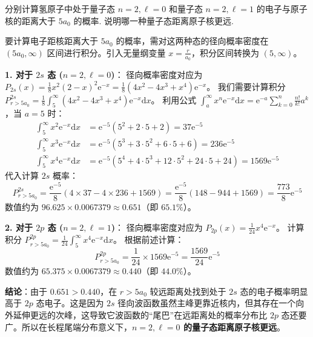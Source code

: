 \begin{exercise}\label{ex:25.8}
分别计算氢原子中处于量子态 $n=2, \ell=0$ 和量子态 $n=2, \ell=1$ 的电子与原子核的距离大于 $5a_0$ 的概率. 说明哪一种量子态距离原子核更远.
\end{exercise}
\begin{solution}
要计算电子距核距离大于 $5a_0$ 的概率，需对这两种态的径向概率密度在 $(5a_0, \infty)$ 区间进行积分。引入无量纲变量 $x = \frac{r}{a_0}$，积分区间转换为 $(5, \infty)$。

\textbf{1. 对于 $2s$ 态 ($n=2, \ell=0$)}：
径向概率密度对应为 $P_{2s}(x) = \frac{1}{8} x^2 (2 - x)^2 \mathrm{e}^{-x} = \frac{1}{8} (4x^2 - 4x^3 + x^4) \mathrm{e}^{-x}$。
我们需要计算积分 $P_{r>5a_0}^{2s} = \frac{1}{8} \int_5^\infty (4x^2 - 4x^3 + x^4) \mathrm{e}^{-x} \mathrm{d}x$。
利用公式 $\int_a^\infty x^n \mathrm{e}^{-x} \mathrm{d}x = \mathrm{e}^{-a} \sum_{k=0}^n \frac{n!}{k!} a^k$，当 $a=5$ 时：
\begin{align*}
    \int_5^\infty x^2 \mathrm{e}^{-x} \mathrm{d}x &= \mathrm{e}^{-5} (5^2 + 2\cdot 5 + 2) = 37 \mathrm{e}^{-5} \\
    \int_5^\infty x^3 \mathrm{e}^{-x} \mathrm{d}x &= \mathrm{e}^{-5} (5^3 + 3\cdot 5^2 + 6\cdot 5 + 6) = 236 \mathrm{e}^{-5} \\
    \int_5^\infty x^4 \mathrm{e}^{-x} \mathrm{d}x &= \mathrm{e}^{-5} (5^4 + 4\cdot 5^3 + 12\cdot 5^2 + 24\cdot 5 + 24) = 1569 \mathrm{e}^{-5}
\end{align*}
代入计算 $2s$ 概率：
$$ P_{r>5a_0}^{2s} = \frac{\mathrm{e}^{-5}}{8} \left( 4 \times 37 - 4 \times 236 + 1569 \right) = \frac{\mathrm{e}^{-5}}{8} (148 - 944 + 1569) = \frac{773}{8} \mathrm{e}^{-5} $$
数值约为 $96.625 \times 0.0067379 \approx 0.651$（即 $65.1\%$）。

\textbf{2. 对于 $2p$ 态 ($n=2, \ell=1$)}：
径向概率密度对应为 $P_{2p}(x) = \frac{1}{24} x^4 \mathrm{e}^{-x}$。
计算积分 $P_{r>5a_0}^{2p} = \frac{1}{24} \int_5^\infty x^4 \mathrm{e}^{-x} \mathrm{d}x$。
根据前述计算：
$$ P_{r>5a_0}^{2p} = \frac{1}{24} \times 1569 \mathrm{e}^{-5} = \frac{1569}{24} \mathrm{e}^{-5} $$
数值约为 $65.375 \times 0.0067379 \approx 0.440$（即 $44.0\%$）。

\textbf{结论}：由于 $0.651 > 0.440$，在 $r > 5a_0$ 较远距离处找到处于 $2s$ 态的电子概率明显高于 $2p$ 态电子。这是因为 $2s$ 径向波函数虽然主峰更靠近核内，但其存在一个向外延伸更远的次峰，这导致它波函数的“尾巴”在远距离处的概率分布比 $2p$ 态还要广。所以在长程尾端分布意义下，\textbf{$n=2, \ell=0$ 的量子态距离原子核更远}。
\end{solution}


